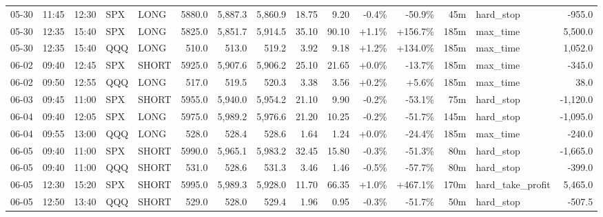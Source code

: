\documentclass[11pt,a4paper,twoside]{article}
\begin{document}
\begin{landscape}
\begin{center}
\begin{longtable}{>{\color{txtmain}}l l l l l r r r r r r r r >{\color{txtmain}}l r}
05-30 & 11:45 & 12:30 & SPX & LONG & 5880.0 & 5,887.3 & 5,860.9 & 18.75 & 9.20 & \textcolor{lossred}{-0.4\%} & \textcolor{lossred}{-50.9\%} & 45m & hard\_stop & \textcolor{lossred}{-955.0} \\
05-30 & 12:35 & 15:40 & SPX & LONG & 5825.0 & 5,851.7 & 5,914.5 & 35.10 & 90.10 & \textcolor{wingreen}{+1.1\%} & \textcolor{wingreen}{+156.7\%} & 185m & max\_time & \textcolor{wingreen}{5,500.0} \\
05-30 & 12:35 & 15:40 & QQQ & LONG & 510.0 & 513.0 & 519.2 & 3.92 & 9.18 & \textcolor{wingreen}{+1.2\%} & \textcolor{wingreen}{+134.0\%} & 185m & max\_time & \textcolor{wingreen}{1,052.0} \\
06-02 & 09:40 & 12:45 & SPX & SHORT & 5925.0 & 5,907.6 & 5,906.2 & 25.10 & 21.65 & \textcolor{wingreen}{+0.0\%} & \textcolor{lossred}{-13.7\%} & 185m & max\_time & \textcolor{lossred}{-345.0} \\
06-02 & 09:50 & 12:55 & QQQ & LONG & 517.0 & 519.5 & 520.3 & 3.38 & 3.56 & \textcolor{wingreen}{+0.2\%} & \textcolor{wingreen}{+5.6\%} & 185m & max\_time & \textcolor{wingreen}{38.0} \\
06-03 & 09:45 & 11:00 & SPX & SHORT & 5955.0 & 5,940.0 & 5,954.2 & 21.10 & 9.90 & \textcolor{lossred}{-0.2\%} & \textcolor{lossred}{-53.1\%} & 75m & hard\_stop & \textcolor{lossred}{-1,120.0} \\
06-04 & 09:40 & 12:05 & SPX & LONG & 5975.0 & 5,989.2 & 5,976.6 & 21.20 & 10.25 & \textcolor{lossred}{-0.2\%} & \textcolor{lossred}{-51.7\%} & 145m & hard\_stop & \textcolor{lossred}{-1,095.0} \\
06-04 & 09:55 & 13:00 & QQQ & LONG & 528.0 & 528.4 & 528.6 & 1.64 & 1.24 & \textcolor{wingreen}{+0.0\%} & \textcolor{lossred}{-24.4\%} & 185m & max\_time & \textcolor{lossred}{-240.0} \\
06-05 & 09:40 & 11:00 & SPX & SHORT & 5990.0 & 5,965.1 & 5,983.2 & 32.45 & 15.80 & \textcolor{lossred}{-0.3\%} & \textcolor{lossred}{-51.3\%} & 80m & hard\_stop & \textcolor{lossred}{-1,665.0} \\
06-05 & 09:40 & 11:00 & QQQ & SHORT & 531.0 & 528.6 & 531.3 & 3.46 & 1.46 & \textcolor{lossred}{-0.5\%} & \textcolor{lossred}{-57.7\%} & 80m & hard\_stop & \textcolor{lossred}{-399.0} \\
06-05 & 12:30 & 15:20 & SPX & SHORT & 5995.0 & 5,989.3 & 5,928.0 & 11.70 & 66.35 & \textcolor{wingreen}{+1.0\%} & \textcolor{wingreen}{+467.1\%} & 170m & hard\_take\_profit & \textcolor{wingreen}{5,465.0} \\
06-05 & 12:50 & 13:40 & QQQ & SHORT & 529.0 & 528.0 & 529.4 & 1.96 & 0.95 & \textcolor{lossred}{-0.3\%} & \textcolor{lossred}{-51.7\%} & 50m & hard\_stop & \textcolor{lossred}{-507.5} \\

\end{longtable}
\end{center}
\end{landscape}
\end{document}
